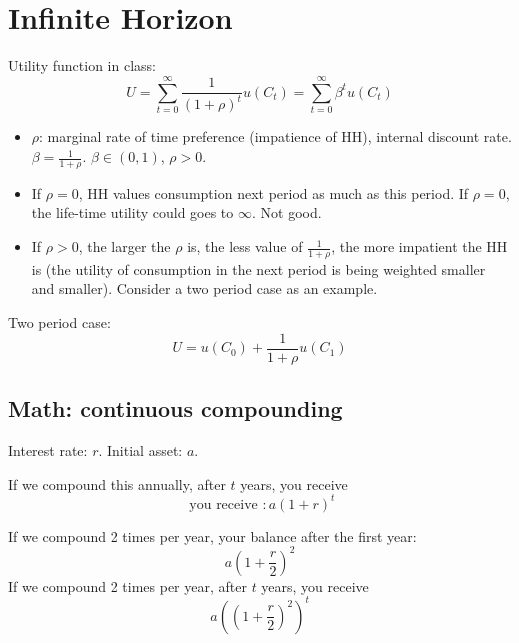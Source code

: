 \documentclass[12pt]{article}
\title{}
\author{}
\date{}
\begin{document}
\section{Infinite Horizon}

Utility function in class:
\begin{equation*}
U = \sum\limits_{t = 0} ^\infty \frac{1}{(1 + \rho)^{t}}	u(C_{t}) = 
\sum\limits_{t = 0} ^\infty \beta^{t}u(C_{t})	
\end{equation*}
\begin{itemize}
		\item $ \rho $: marginal rate of time preference (impatience of HH), internal 
				discount rate. $ \beta = \frac{1}{1 + \rho} $. $ \beta \in (0,1) $, 
				$ \rho > 0 $.
		\item If $ \rho = 0 $, HH values consumption next period as much as this period.
				If $ \rho = 0 $, the life-time utility could goes to $ \infty  $. Not good.
		\item If $ \rho > 0 $, the larger the $ \rho $ is, the less value of 
				$ \frac{1}{1 + \rho} $, the more impatient the HH is (the utility of consumption
				in the next period is being weighted smaller and smaller). Consider a two 
				period case as an example.
\end{itemize}


Two period case:
\begin{equation*}
U = u(C_0) + \frac{1}{1 + \rho}u(C_{1})
\end{equation*}



\subsection{Math: continuous compounding}
Interest rate: $ r $. Initial asset: $ a $.

If we compound this annually, after $ t $ years, you receive
\begin{equation*}
\text{ you receive }: a(1 + r)^{t}
\end{equation*}

If we compound 2 times per year, your balance after the first year:
\begin{equation*}
a(1 + \frac{r}{2})^{2}
\end{equation*}
If we compound 2 times per year, after $ t $ years, you receive
\begin{equation*}
a \left( (1 + \frac{r}{2})^{2} \right) ^{t}
\end{equation*}
\end{document}
